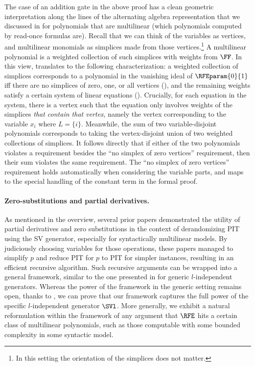 The case of an addition gate in the above proof has a clean geometric interpretation along the lines of the alternating algebra representation that we discussed in  for polynomials that are multilinear (which polynomials computed by read-once formulas are).  Recall that we can think of the variables as vertices, and multilinear monomials as simplices made from those vertices.\footnote{In this setting the orientation of the simplices does not matter.} A multilinear polynomial is a weighted collection of such simplices with weights from \(\FF\).
In this view,  translates to the following characterization: a weighted collection of simplices corresponds to a polynomial in the vanishing ideal of \(\RFEparam{0}{1}\) iff there are no simplices of zero, one, or all vertices (), and the remaining weights satisfy a certain system of linear equations (). 
Crucially, for each equation in the system, there is a vertex such that the equation only involves weights of the simplices \emph{that contain that vertex}, namely the vertex corresponding to the variable $x_i$ where $L = \{i\}$. 
Meanwhile, the sum of two variable-disjoint polynomials corresponds to taking the vertex-disjoint union of two weighted collections of simplices.
It follows directly that if either of the two polynomials violates a requirement besides the ``no simplex of zero vertices'' requirement, then their sum violates the same requirement. The ``no simplex of zero vertices'' requirement holds automatically when considering the variable parts, and maps to the special handling of the constant term in the formal proof. 

\paragraph{Zero-substitutions and partial derivatives.}
As mentioned in the overview,
several prior papers demonstrated the utility of partial derivatives and zero
substitutions in the context of derandomizing PIT using the SV generator,
especially for syntactically multilinear models.
By judiciously choosing variables for those operations,
these papers managed to simplify $p$ and reduce PIT for $p$ to PIT for simpler
instances, resulting in an efficient recursive algorithm.
Such recursive arguments can be wrapped into a general framework, similar to the one presented in \cite{MediniShpilka2021} for generic $l$-independent generators. Whereas the power of the framework in the generic setting remains open, thanks to , we can prove that our framework captures the full power of the specific $l$-independent generator $\SVl$. More generally, we exhibit a natural reformulation within the framework of any argument that $\RFE$ hits a certain class of multilinear polynomials, such as those computable with some bounded complexity in some syntactic model.

